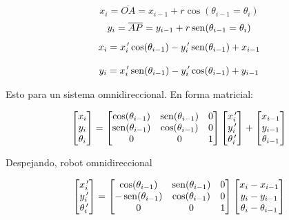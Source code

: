 $$x_{i} = \overline{OA} = x_{i - 1} + r\cos (\theta_{i - 1} = \theta_{i})$$
$$y_{i} = \overline{AP} = y_{i - 1} + r\mathop{\rm sen}\nolimits (\theta_{i - 1} = \theta_{i})$$
$$x_{i} = x_{i}^{\,\prime} \cos (\theta_{i - 1}) - y_{i}^{\,\prime} \mathop{\rm sen}\nolimits (\theta_{i - 1}) + x_{i - 1}$$

$$y_{i} = x_{i}^{\,\prime} \mathop{\rm sen}\nolimits (\theta_{i - 1}) - y_{i}^{\,\prime} \cos (\theta_{i - 1}) + y_{i - 1}$$

Esto para un sistema omnidireccional. En forma matricial:

$$
\begin{bmatrix}
x_{i} \\
y_{i} \\
\theta_{i}
\end{bmatrix} = \begin{bmatrix}
\cos (\theta_{i - 1}) & \mathop{\rm sen}\nolimits (\theta_{i - 1}) & 0 \\
\mathop{\rm sen}\nolimits (\theta_{i - 1}) & \cos (\theta_{i - 1}) & 0 \\
0                     &                0      & 1
\end{bmatrix} \begin{bmatrix}
x_{i}^{\,\prime} \\
y_{i}^{\,\prime} \\
\theta_{i}^{\,\prime}
\end{bmatrix} + \begin{bmatrix}
x_{i - 1} \\
y_{i - 1} \\
\theta_{i - 1}
\end{bmatrix}
$$

Despejando, robot omnidireccional

$$
\begin{bmatrix}
x_{i}^{\,\prime} \\
y_{i}^{\, \prime} \\
\theta_{i}^{\, \prime}
\end{bmatrix} = \begin{bmatrix}
\cos (\theta_{i - 1}) & \mathop{\rm sen}\nolimits (\theta_{i - 1}) & 0 \\
- \mathop{\rm sen}\nolimits (\theta_{i - 1}) & \cos (\theta_{i - 1}) & 0 \\
0                     &                0      & 1
\end{bmatrix} \begin{bmatrix}
x_{i} - x_{i - 1} \\
y_{i} - y_{i - 1}\\
\theta_{i} - \theta_{i - 1}
\end{bmatrix} 
$$

